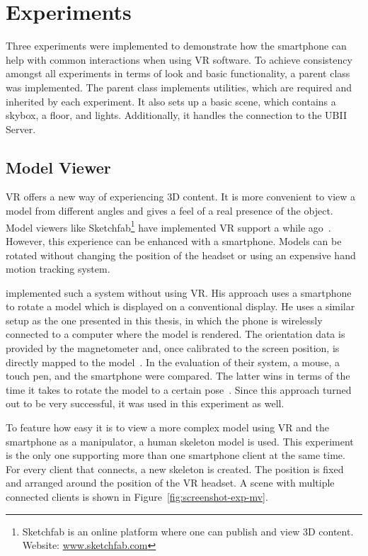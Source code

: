 \section{Experiments}\label{section:experiments}

Three experiments were implemented to demonstrate how the smartphone can help with common interactions when using \ac{VR} software.
To achieve consistency amongst all experiments in terms of look and basic functionality, a parent class was implemented. The parent class implements utilities, which are required and inherited by each experiment. It also sets up a basic scene, which contains a skybox, a floor, and lights. Additionally, it handles the connection to the \ac{UBII} Server.


\subsection{Model Viewer}\label{subsection:model-viewer}

\acl{VR} offers a new way of experiencing \ac{3D} content. It is more convenient to view a model from different angles and gives a feel of a real presence of the object. Model viewers like Sketchfab\footnote{Sketchfab is an online platform where one can publish and view \ac{3D} content. Website: \href{https://sketchfab.com}{www.sketchfab.com}} have implemented \ac{VR} support a while ago~\cite{Denoyel.2016}. However, this experience can be enhanced with a smartphone. Models can be rotated without changing the position of the headset or using an expensive hand motion tracking system.

\citeauthor{Katzakis.2010} implemented such a system without using \ac{VR}. His approach uses a smartphone to rotate a model which is displayed on a conventional display. He uses a similar setup as the one presented in this thesis, in which the phone is wirelessly connected to a computer where the model is rendered. The orientation data is provided by the magnetometer and, once calibrated to the screen position, is directly mapped to the model~\cite[139]{Katzakis.2010}. In the evaluation of their system, a mouse, a touch pen, and the smartphone were compared. The latter wins in terms of the time it takes to rotate the model to a certain pose~\cite[140]{Katzakis.2010}.
Since this approach turned out to be very successful, it was used in this experiment as well.

To feature how easy it is to view a more complex model using VR and the smartphone as a manipulator, a human skeleton model is used. This experiment is the only one supporting more than one smartphone client at the same time. For every client that connects, a new skeleton is created. The position is fixed and arranged around the position of the \ac{VR} headset. A scene with multiple connected clients is shown in Figure~\ref{fig:screenshot-exp-mv}.

